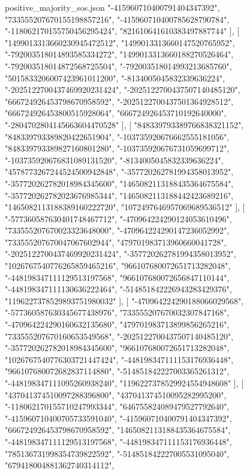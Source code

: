 \begin{filecontents*}[overwrite]{positive_majority_sos.json}
    "-415960710400791404347392",
    "733555207670155198857216",
    "-415960710400785628790784",
    "-118062170155750456295424",
    "821610641610383497887744"
   ],
   [
    "1499013313660230945472512",
    "1499013313660147520765952",
    "-792003518014893585334272",
    "1499013313660188270526464",
    "-792003518014872568725504",
    "-792003518014993213685760",
    "5015833206007423961011200",
    "-8134005045832339636224",
    "-2025122700437469920231424",
    "-2025122700437507140485120",
    "666724926453798670958592",
    "-2025122700437501364928512",
    "666724926453800515928064",
    "666724926453710192640000",
    "-2804702804145663604470528"
   ],
   [
    "848339793389766838321152",
    "848339793389820422651904",
    "-103735920676662555181056",
    "848339793389827160801280",
    "-103735920676731059699712",
    "-103735920676831089131520",
    "-8134005045832339636224",
    "4578773267244524500942848",
    "-357720262781994358013952",
    "-357720262782018984345600",
    "1465082113188435364675584",
    "-357720262782023676985344",
    "1465082113188442423689216",
    "1465082113188389160222720",
    "1072497646957069689536512"
   ],
   [
    "-577360587630401748467712",
    "-470964224290124053610496",
    "733555207670023323648000",
    "-470964224290147236052992",
    "733555207670047067602944",
    "479701983713960660041728",
    "-2025122700437469920231424",
    "-357720262781994358013952",
    "1026767540776265859465216",
    "966107680072651713282048",
    "-448198347111129513197568",
    "966107680072656847110144",
    "-448198347111130636222464",
    "-514851842226943283429376",
    "1196227378529893751980032"
   ],
   [
    "-470964224290188066029568",
    "-577360587630345677438976",
    "733555207670032307847168",
    "-470964224290160632135680",
    "479701983713899856265216",
    "733555207670160653549568",
    "-2025122700437507140485120",
    "-357720262782018984345600",
    "966107680072651713282048",
    "1026767540776303721447424",
    "-448198347111153176936448",
    "966107680072682837114880",
    "-514851842227003365261312",
    "-448198347111095260938240",
    "1196227378529924554948608"
   ],
   [
    "437041374510097288396800",
    "437041374510095282995200",
    "-118062170155710247993344",
    "646755824089479527792640",
    "-415960710400705733591040",
    "-415960710400791404347392",
    "666724926453798670958592",
    "1465082113188435364675584",
    "-448198347111129513197568",
    "-448198347111153176936448",
    "785136731998354739822592",
    "-514851842227005531095040",
    "679418004881362740314112",

\end{filecontents*}
